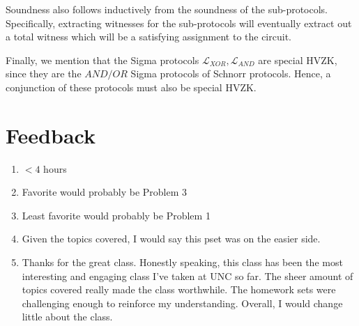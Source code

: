 \documentclass[12pt]{article}%
\begin{document}
\noindent Soundness also follows inductively from the soundness of the sub-protocols. Specifically, extracting witnesses for the sub-protocols  will eventually extract out a total witness which will be a satisfying assignment to the circuit. \newline

\noindent Finally, we mention that the Sigma protocols $\mathcal{L}_{XOR},\mathcal{L}_{AND}$ are special HVZK, since they are the $AND/OR$ Sigma protocols of Schnorr protocols. Hence, a conjunction of these protocols must also be special HVZK.

\section*{Feedback}
\begin{enumerate}
  \item $<4$ hours
  \item Favorite would probably be Problem 3
  \item Least favorite would probably be Problem 1
  \item Given the topics covered, I would say this pset was on the easier side.
  \item Thanks for the great class. Honestly speaking, this class has been the most interesting and engaging class I've taken at UNC so far. The sheer amount of topics covered really made the class worthwhile. The homework sets were challenging enough to reinforce my understanding. Overall, I would change little about the class.
\end{enumerate}
\end{document}
